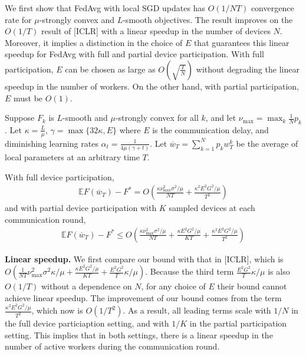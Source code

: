 We first show that FedAvg with local SGD updates has $O(1/NT)$ convergence
rate for $\mu$-strongly convex and $L$-smooth objectives. The result
improves on the $O(1/T)$ result of {[}ICLR{]} with a linear speedup
in the number of devices $N$. Moreover, it implies a distinction
in the choice of $E$ that guarantees this linear speedup for FedAvg
with full and partial device participation. With full participation,
$E$ can be chosen as large as $O(\sqrt{\frac{T}{N}})$ without degrading
the linear speedup in the number of workers. On the other hand, with
partial participation, $E$ must be $O(1)$. 
\begin{theorem}
	Suppose $F_{k}$ is $L$-smooth and $\mu$-strongly convex for all
	$k$, and let $\nu_{\max}=\max_{k}\frac{1}{N}p_{k}$. Let $\kappa=\frac{L}{\mu}$,
	$\gamma=\max\{32\kappa,E\}$ where $E$ is the communication delay,
	and diminishing learning rates $\alpha_{t}=\frac{1}{4\mu(\gamma+t)}$.
	Let $\overline{w}_{T}=\sum_{k=1}^{N}p_{k}w_{T}^{k}$ be the average
	of local parameters at an arbitrary time $T$.
	
	With full device participation, 
	\begin{align*}
	\mathbb{E}F(\overline{w}_{T})-F^{\ast}=O(\frac{\kappa\nu_{\max}^{2}\sigma^{2}/\mu}{NT}+\frac{\kappa^{2}E^{2}G^{2}/\mu}{T^{2}})
	\end{align*}
	and with partial device participation with $K$ sampled devices at
	each communication round, 
	\begin{align*}
	\mathbb{E}F(\overline{w}_{T})-F^{\ast}\leq O(\frac{\kappa\nu_{\max}^{2}\sigma^{2}/\mu}{NT}+\frac{\kappa E^{2}G^{2}/\mu}{KT}+\frac{\kappa^{2}E^{2}G^{2}/\mu}{T^{2}})
	\end{align*}
\end{theorem}
%
\begin{remark}
	\textbf{Linear speedup. }We first compare our bound with that in {[}ICLR{]},
	which is $O(\frac{1}{NT}\nu_{\max}^{2}\sigma^{2}\kappa/\mu+\frac{\kappa E^{2}G^{2}/\mu}{KT}+\frac{E^{2}G^{2}}{T}\kappa/\mu)$.
	Because the third term $\frac{E^{2}G^{2}}{T}\kappa/\mu$ is also $O(1/T)$
	without a dependence on $N$, for any choice of $E$ their bound cannot
	achieve linear speedup. The improvement of our bound comes from the
	term $\frac{\kappa^{2}E^{2}G^{2}/\mu}{T^{2}}$, which now is $O(1/T^{2})$.
	As a result, all leading terms scale with $1/N$ in the full device
	particiaption setting, and with $1/K$ in the partial participation
	setting. This implies that in both settings, there is a linear speedup
	in the number of active workers during the communication round.
\end{remark}
